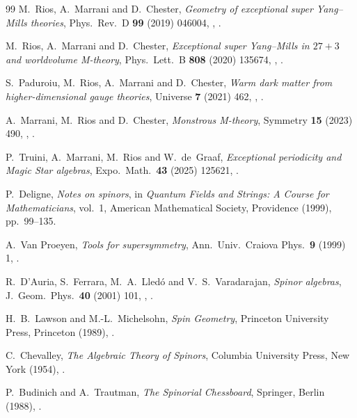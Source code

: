 \begin{thebibliography}{99}
M.~Rios, A.~Marrani and D.~Chester, \textit{Geometry of exceptional super Yang--Mills theories}, Phys.\ Rev.\ D \textbf{99} (2019) 046004, , .

M.~Rios, A.~Marrani and D.~Chester, \textit{Exceptional super Yang--Mills in $27+3$ and worldvolume M-theory}, Phys.\ Lett.\ B \textbf{808} (2020) 135674, , .

S.~Paduroiu, M.~Rios, A.~Marrani and D.~Chester, \textit{Warm dark matter from higher-dimensional gauge theories}, Universe \textbf{7} (2021) 462, , .

A.~Marrani, M.~Rios and D.~Chester, \textit{Monstrous M-theory}, Symmetry \textbf{15} (2023) 490, , .

P.~Truini, A.~Marrani, M.~Rios and W.~de~Graaf, \textit{Exceptional periodicity and Magic Star algebras}, Expo.\ Math.\ \textbf{43} (2025) 125621, .

P.~Deligne, \textit{Notes on spinors}, in \textit{Quantum Fields and Strings: A Course for Mathematicians}, vol.~1, American Mathematical Society, Providence (1999), pp.~99--135.

A.~Van Proeyen, \textit{Tools for supersymmetry}, Ann.\ Univ.\ Craiova Phys.\ \textbf{9} (1999) 1, .

R.~D'Auria, S.~Ferrara, M.~A.~Lled\'o and V.~S.~Varadarajan, \textit{Spinor algebras}, J.\ Geom.\ Phys.\ \textbf{40} (2001) 101, , .

H.~B.~Lawson and M.-L.~Michelsohn, \textit{Spin Geometry}, Princeton University Press, Princeton (1989), .

C.~Chevalley, \textit{The Algebraic Theory of Spinors}, Columbia University Press, New York (1954), .

P.~Budinich and A.~Trautman, \textit{The Spinorial Chessboard}, Springer, Berlin (1988), .


\end{thebibliography}
